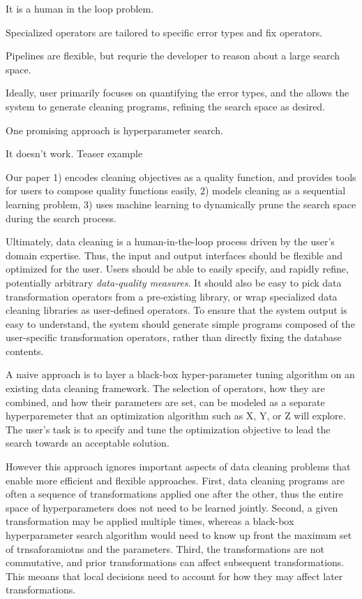 It is a human in the loop problem.


Specialized operators are tailored to specific error types and fix operators.

Pipelines are flexible, but requrie the developer to reason about a large search space.

Ideally, user primarily focuses on quantifying the error types, and the allows the system to generate cleaning programs, refining the search space as desired.

One promising approach is hyperparameter search.

It doesn't work.  Teaser example

Our paper 1) encodes cleaning objectives as a quality function, and provides tools for users to compose quality functions easily, 2) models cleaning as a sequential learning problem, 3) uses machine learning to dynamically prune the search space during the search process.  



Ultimately, data cleaning is a human-in-the-loop process driven by the user's domain expertise.  Thus, the input and output interfaces should be flexible and optimized for the user.   Users should be able to easily specify, and rapidly refine, potentially arbitrary {\it data-quality measures}.  It should also be easy to pick data transformation operators from a pre-existing library, or wrap specialized data cleaning libraries as user-defined operators.  To ensure that the system output is easy to understand, the system should generate simple programs composed of the user-specific transformation operators, rather than directly fixing the database contents.

A naive approach is to layer a black-box hyper-parameter tuning algorithm on an existing data cleaning framework.  The selection of operators, how they are combined, and how their parameters are set, can be modeled as a separate hyperparemeter that an optimization algorithm such as X, Y, or Z will explore.  The user's task is to specify and tune the optimization objective to lead the search towards an acceptable solution.   

However this approach ignores important aspects of data cleaning problems that enable more efficient and flexible approaches.  First, data cleaning programs are often a sequence of transformations applied one after the other, thus the entire space of hyperparameters does not need to be learned jointly.  Second, a given transformation may be applied multiple times, whereas a black-box hyperparameter search algorithm would need to know up front the maximum set of trnsaforamiotns and the parameters. Third, the transformations are not commutative, and prior transformations can affect subsequent transformations.  This meoans that local decisions need to account for how they may affect later transformations.  


